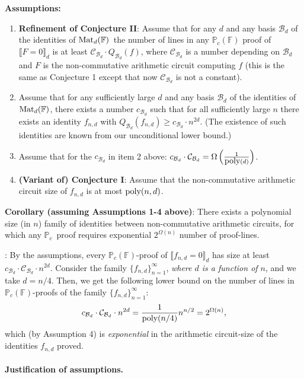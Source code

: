 \documentclass[12pt,reqno]{article}
\newcommand\F{\ensuremath{\mathbb F}}
\newcommand\PP{{\mathbb P}}
\newcommand\PC{\ensuremath{\PP_c}}
\newcommand{\poly}{\hbox{poly}}
\newcommand{\cd}{\cdot}
\newcommand {\ind} {\noindent}
\newcommand {\para}[1] {\paragraph{#1}}
\newcommand{\matd}{{\ensuremath{{\rm Mat}_d(\F)}}}
\newenvironment{proof}{\QuadSpace\par\noindent{\bf Proof}:}{\EndProof\HalfSpace}
\newcommand{\QuadSpace}{\vspace{0.25\baselineskip}}
\newcommand{\HalfSpace}{\vspace{0.5\baselineskip}}
\newcommand{\EndProof}{ \hfill \vrule width 1ex height 1ex depth 0pt }
\begin{document}
\medskip

\ind\textbf{Assumptions:}

\begin{enumerate}

\item \textbf{Refinement of Conjecture II}: Assume that for any $d$ and any basis $\mathcal B_d$ of the identities of \matd\ the number of lines in any $\PC(\F)$ proof of $\llbracket F= 0\rrbracket_d$ is at least  $\mathcal C_{\mathcal B_d}\cd Q_{\mathcal B_d}(f)$, where $\mathcal C_{\mathcal B_d}$ is a number depending on \(\mathcal B_{d}\)  and $F$ is the non-commutative arithmetic circuit computing $f$ (this is the same as Conjecture 1 except that now $\mathcal C_{\mathcal B_d}$ is not a constant).


\item Assume that for any sufficiently large $d$ and any basis $\mathcal B_d$ of the identities of \matd, there exists a number $c_{\mathcal B_d}$ such that for all sufficiently large \(n\) there exists an identity $f_{n,d}$ with  $Q_{\mathcal B_d}(f_{n,d})\ge c_{\mathcal B_d}\cd n^{2d}$. (The existence of such identities are known from our unconditional lower bound.)

\item Assume that for the \(c_{\mathcal B_{d}}\) in item 2 above:   $c_{\mathcal B_d}\cd \mathcal C_{\mathcal B_d}= \Omega\left(\frac{1}{\poly(d)}\right)$.

\item \textbf{(Variant of) Conjecture I}: Assume that the non-commutative arithmetic circuit size of $f_{n,d}$ is  at most $\poly(n,d)$.
\end{enumerate}

\ind\textbf{Corollary (assuming Assumptions 1-4 above)}:
There exists a polynomial size (in $n$) family of identities between non-commutative arithmetic circuits, for which any \PC\ proof requires exponential $2^{\Omega(n)}$ number of proof-lines.

\begin{proof} By the assumptions, every $\PC(\F)$-proof of $\llbracket f_{n,d}=0 \rrbracket_d$ has size at least $c_{\mathcal B_d}\cd
\mathcal C_{\mathcal B_d}\cd n^{2d}$.  Consider the family $\{ f_{n,d}\}_{n=1}^\infty$, \textit{where $d$ is a function of $n$}, and we take  $d=n/4$. Then, we get the following lower bound on the number of lines in   $\PC(\F)$-proofs of the family $\{ f_{n,d}\}_{n=1}^\infty$:
\[c_{\mathcal B_d}\cd \mathcal C_{\mathcal B_d}\cd n^{2d}=\frac{1}{\poly(n/4)}n^{n/2}= 2^{\Omega(n)}
,
 \]
which (by Assumption 4) is \textit{exponential} in the arithmetic circuit-size of the identities \(f_{n,d}\) proved.
\end{proof}
\para{Justification of assumptions.}
\end{document}
